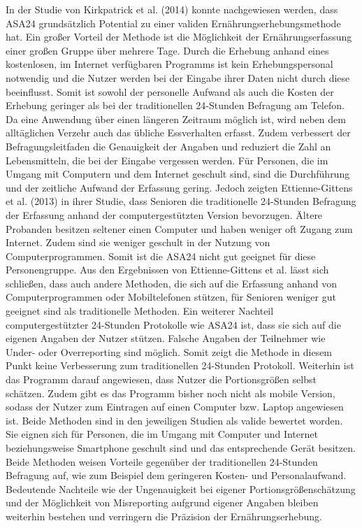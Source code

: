 In der Studie von Kirkpatrick et al. (2014) konnte nachgewiesen werden, dass ASA24 grundsätzlich Potential zu einer validen Ernährungserhebungsmethode hat. Ein großer Vorteil der Methode ist die Möglichkeit der  Ernährungserfassung einer großen Gruppe über mehrere Tage. Durch die Erhebung anhand eines kostenlosen, im Internet verfügbaren Programms ist kein Erhebungspersonal notwendig und die Nutzer werden bei der Eingabe ihrer Daten nicht durch diese beeinflusst. Somit ist sowohl der personelle Aufwand als auch die Kosten der Erhebung geringer als bei der traditionellen 24-Stunden Befragung am Telefon. Da eine Anwendung über einen längeren Zeitraum möglich ist, wird neben dem alltäglichen Verzehr auch das übliche Essverhalten erfasst. Zudem verbessert der Befragungsleitfaden die Genauigkeit der Angaben und reduziert die Zahl an Lebensmitteln, die bei der Eingabe vergessen werden.  Für Personen, die im Umgang mit Computern und dem Internet geschult sind, sind die Durchführung und der zeitliche Aufwand der Erfassung gering. Jedoch zeigten Ettienne-Gittens et al. (2013) in ihrer Studie, dass Senioren die traditionelle 24-Stunden Befragung der Erfassung anhand der computergestützten Version bevorzugen. Ältere Probanden besitzen seltener einen Computer und haben weniger oft Zugang zum Internet. Zudem sind sie weniger geschult in der Nutzung von Computerprogrammen. Somit ist die ASA24 nicht gut geeignet für diese Personengruppe. Aus den Ergebnissen von Ettienne-Gittens et al. lässt sich schließen, dass auch andere Methoden, die sich auf die Erfassung anhand von Computerprogrammen oder Mobiltelefonen stützen, für Senioren weniger gut geeignet sind als traditionelle Methoden. Ein weiterer Nachteil computergestützter 24-Stunden Protokolle wie ASA24 ist, dass sie sich auf die eigenen Angaben der Nutzer stützen. Falsche Angaben der Teilnehmer wie Under- oder Overreporting sind möglich. Somit zeigt die Methode in diesem Punkt keine Verbesserung zum traditionellen 24-Stunden Protokoll. Weiterhin ist das Programm darauf angewiesen, dass Nutzer die Portionsgrößen selbst schätzen. Zudem gibt es das Programm bisher noch nicht als mobile Version, sodass der Nutzer zum Eintragen auf einen Computer bzw. Laptop angewiesen ist. 
Beide Methoden sind in den jeweiligen Studien als valide bewertet worden. Sie eignen sich für Personen, die im Umgang mit Computer und Internet beziehungsweise Smartphone geschult sind und das entsprechende Gerät besitzen. Beide Methoden weisen Vorteile gegenüber der traditionellen 24-Stunden Befragung auf, wie zum Beispiel dem geringeren Kosten- und Personalaufwand. Bedeutende Nachteile wie der Ungenauigkeit bei eigener Portionsgrößenschätzung und der Möglichkeit von Misreporting aufgrund eigener Angaben bleiben weiterhin bestehen und verringern die Präzision der Ernährungserhebung. \\

